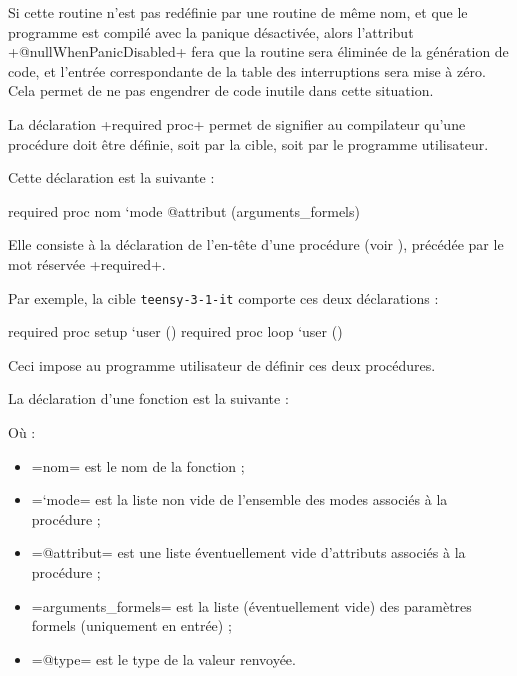 Si cette routine n'est pas redéfinie par une routine de même nom, et que le programme est compilé avec la panique désactivée, alors l'attribut \plm+@nullWhenPanicDisabled+ fera que la routine sera éliminée de la génération de code, et l'entrée correspondante de la table des interruptions sera mise à zéro. Cela permet de ne pas engendrer de code inutile dans cette situation.

 






La déclaration \plm+required proc+ permet de signifier au compilateur qu'une procédure doit être définie, soit par la cible, soit par le programme utilisateur.

Cette déclaration est la suivante :
\begin{PLM}
required proc nom `mode @attribut (arguments_formels)
\end{PLM}

Elle consiste à la déclaration de l'en-tête d'une procédure (voir ), précédée par le mot réservée \plm+required+.

Par exemple, la cible \texttt{teensy-3-1-it} comporte ces deux déclarations :

\begin{PLM}
required proc setup `user ()
required proc loop `user ()
\end{PLM}

Ceci impose au programme utilisateur de définir ces deux procédures.











La déclaration d'une fonction est la suivante :
Où :
\begin{itemize}
  \item \plm=nom= est le nom de la fonction ;
  \item \plm=`mode= est la liste non vide de l'ensemble des modes associés à la procédure ;
  \item \plm=@attribut= est une liste éventuellement vide d'attributs associés à la procédure ;
  \item \plm=arguments_formels= est la liste (éventuellement vide) des paramètres formels (uniquement en entrée) ;
  \item \plm=@type= est le type de la valeur renvoyée.
\end{itemize}

